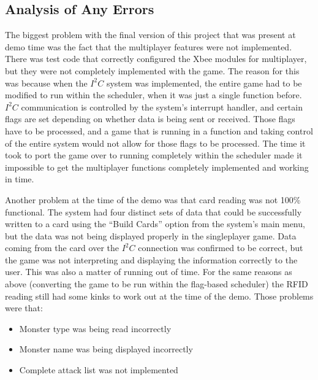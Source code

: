 \documentclass[12pt]{article} %
\begin{document}
\subsection{Analysis of Any Errors } %
%

The biggest problem with the final version of this project that was present at
demo time was the fact that the multiplayer features were not implemented.
There was test code that correctly configured the Xbee modules for multiplayer,
but they were not completely implemented with the game.  The reason for this
was because when the $I^2C$ system was implemented, the entire game had to be
modified to run within the scheduler, when it was just a single function
before.  $I^2C$ communication is controlled by the system's interrupt handler,
and certain flags are set depending on whether data is being sent or received.
Those flags have to be processed, and a game that is running in a function and
taking control of the entire system would not allow for those flags to be
processed.  The time it took to port the game over to running completely within
the scheduler made it impossible to get the multiplayer functions completely
implemented and working in time.

Another problem at the time of the demo was that card reading was not 100\%
functional.  The system had four distinct sets of data that could be
successfully written to a card using the ``Build Cards'' option from the
system's main menu, but the data was not being displayed properly in the
singleplayer game.  Data coming from the card over the $I^2C$ connection was
confirmed to be correct, but the game was not interpreting and displaying the
information correctly to the user.  This was also a matter of running out of
time.  For the same reasons as above (converting the game to be run within the
flag-based scheduler) the RFID reading still had some kinks to work out at the
time of the demo.  Those problems were that:

\begin{itemize}
	\item Monster type was being read incorrectly
	\item Monster name was being displayed incorrectly
	\item Complete attack list was not implemented
\end{itemize}
\end{document}

